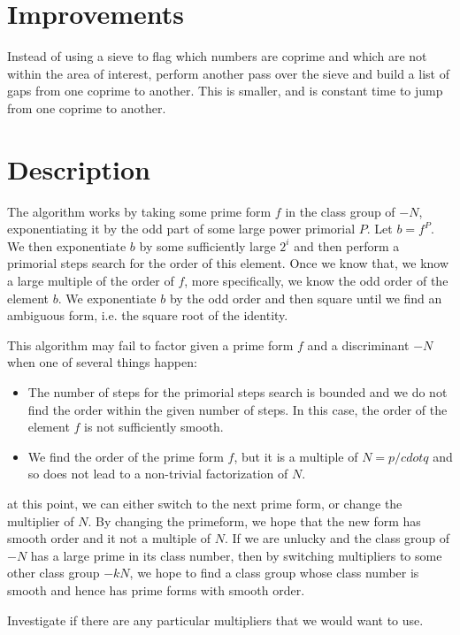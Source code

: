 \documentclass[11pt, letterpaper]{article}
\theoremstyle{definition}
\begin{document}
\section{Improvements}
Instead of using a sieve to flag which numbers are coprime and which are not within the area of interest, perform another pass over the sieve and build a list of gaps from one coprime to another.  This is smaller, and is constant time to jump from one coprime to another.

\section{Description}
The algorithm works by taking some prime form $f$ in the class group of $-N$, exponentiating it by the odd part of some large power primorial $P$.  Let $b=f^P$.  We then exponentiate $b$ by some sufficiently large $2^i$ and then perform a primorial steps search for the order of this element.  Once we know that, we know a large multiple of the order of $f$, more specifically, we know the odd order of the element $b$.  We exponentiate $b$ by the odd order and then square until we find an ambiguous form, i.e. the square root of the identity.

\bigbreak
This algorithm may fail to factor given a prime form $f$ and a discriminant $-N$ when one of several things happen:
\begin{itemize}
\item The number of steps for the primorial steps search is bounded and we do not find the order within the given number of steps.  In this case, the order of the element $f$ is not sufficiently smooth.  

\item We find the order of the prime form $f$, but it is a multiple of $N = p /cdot q$ and so does not lead to a non-trivial factorization of $N$.
\end{itemize}

at this point, we can either switch to the next prime form, or change the multiplier of $N$. By changing the primeform, we hope that the new form has smooth order and it not a multiple of $N$.  If we are unlucky and the class group of $-N$ has a large prime in its class number, then by switching multipliers to some other class group $-kN$, we hope to find a class group whose class number is smooth and hence has prime forms with smooth order.

\bigbreak
Investigate if there are any particular multipliers that we would want to use.
\end{document}
